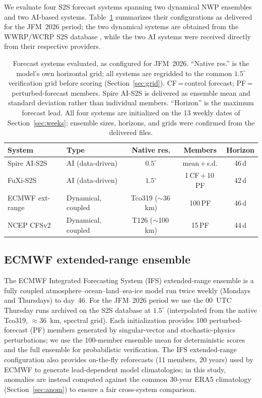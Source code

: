 \documentclass[11pt]{article}
\begin{document}
We evaluate four S2S forecast systems spanning two dynamical NWP ensembles and two
AI-based systems. Table~\ref{tab:models} summarizes their configurations as delivered
for the JFM~2026 period; the two dynamical systems are obtained from the WWRP/WCRP S2S
database \citep{vitart2017}, while the two AI systems were received directly from
their respective providers.

\begin{table}[t]
  \caption{Forecast systems evaluated, as configured for JFM~2026.
  ``Native res.'' is the model's own horizontal grid; all systems are
  regridded to the common $1.5^{\circ}$ verification grid before scoring
  (Section~\ref{sec:grid}). CF\,=\,control forecast; PF\,=\,perturbed-forecast
  members. Spire AI-S2S is delivered as ensemble mean and standard deviation
  rather than individual members. ``Horizon'' is the maximum forecast lead.
  All four systems are initialized on the 13 weekly dates of
  Section~\ref{sec:weeks}; ensemble sizes, horizons, and grids were confirmed
  from the delivered files.}
  \label{tab:models}
  \centering
  \small
  \setlength{\tabcolsep}{6pt}
  \begin{tabular}{llccc}
    \toprule
    System & Type & Native res. & Members & Horizon \\
    \midrule
    Spire AI-S2S    & AI (data-driven)    & $0.5^{\circ}$          & mean\,$+$\,s.d.     & 46\,d \\
    FuXi-S2S        & AI (data-driven)    & $1.5^{\circ}$          & 1\,CF\,$+$\,10\,PF  & 42\,d \\
    ECMWF ext-range & Dynamical, coupled  & Tco319 ($\sim$36\,km)  & 100\,PF             & 46\,d \\
    NCEP CFSv2      & Dynamical, coupled  & T126 ($\sim$100\,km)   & 15\,PF              & 44\,d \\
    \bottomrule
  \end{tabular}
\end{table}

\subsection{ECMWF extended-range ensemble}\label{sec:ecmwf}

The ECMWF Integrated Forecasting System (IFS) extended-range ensemble
\citep{vitart2014} is a fully coupled atmosphere--ocean--land--sea-ice
model run twice weekly (Mondays and Thursdays) to day~46. For the JFM~2026
period we use the 00~UTC Thursday runs archived on the S2S database
\citep{vitart2017} at $1.5^{\circ}$ (interpolated from the native Tco319,
$\approx$36~km, spectral grid). Each initialization provides 100
perturbed-forecast (PF) members generated by singular-vector and
stochastic-physics perturbations; we use the 100-member ensemble mean for
deterministic scores and the full ensemble for probabilistic verification.
The IFS extended-range configuration also provides on-the-fly reforecasts
(11 members, 20 years) used by ECMWF to generate lead-dependent model
climatologies; in this study, anomalies are instead computed against the
common 30-year ERA5 climatology (Section~\ref{sec:anom}) to ensure a fair
cross-system comparison.
\end{document}
